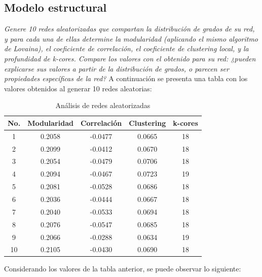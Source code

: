 \documentclass[12pt]{article}
\begin{document}
\subsection{Modelo estructural} 
\textit{Genere 10 redes aleatorizadas que compartan la distribución de grados de su red, y para cada una de ellas determine la modularidad (aplicando el mismo algoritmo de Lovaina), el coeficiente de correlación, el coeficiente de clustering local, y la profundidad de k-cores. Compare los valores con el obtenido para su red: ¿pueden explicarse sus valores a partir de la distribución de grados, o parecen ser propiedades específicas de la red?}
A continuación se presenta una tabla con los valores obtenidos al generar 10 redes aleatorias:
\begin{table}[H]
    \centering
    \begin{tabular}{|c|c|c|c|c|}
        \hline
        No. & Modularidad & Correlación & Clustering & k-cores \\
        \hline
        1  & 0.2058 & -0.0477 & 0.0665 & 18 \\
        2  & 0.2099 & -0.0412 & 0.0670 & 18 \\
        3  & 0.2054 & -0.0479 & 0.0706 & 18 \\
        4  & 0.2094 & -0.0467 & 0.0723 & 19 \\
        5  & 0.2081 & -0.0528 & 0.0686 & 18 \\
        6  & 0.2036 & -0.0444 & 0.0667 & 18 \\
        7  & 0.2040 & -0.0533 & 0.0694 & 18 \\
        8  & 0.2076 & -0.0547 & 0.0685 & 18 \\
        9  & 0.2066 & -0.0288 & 0.0634 & 19 \\
        10 & 0.2105 & -0.0430 & 0.0690 & 18 \\
        \hline
    \end{tabular}
    \caption{Análisis de redes aleatorizadas}
    \label{tab:redes_aleatorizadas}
\end{table}
Considerando los valores de la tabla anterior, se puede observar lo siguiente:
\end{document}
